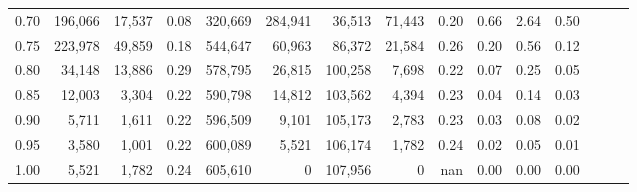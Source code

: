 \begin{tabular}{rrrrrrrrrrrrrrr}
0.70 &  196,066 &  17,537 &  0.08 &  320,669 &  284,941 &   36,513 &   71,443 &  0.20 &  0.66 &  2.64 &      0.50 \\
0.75 &  223,978 &  49,859 &  0.18 &  544,647 &   60,963 &   86,372 &   21,584 &  0.26 &  0.20 &  0.56 &      0.12 \\
0.80 &   34,148 &  13,886 &  0.29 &  578,795 &   26,815 &  100,258 &    7,698 &  0.22 &  0.07 &  0.25 &      0.05 \\
0.85 &   12,003 &   3,304 &  0.22 &  590,798 &   14,812 &  103,562 &    4,394 &  0.23 &  0.04 &  0.14 &      0.03 \\
0.90 &    5,711 &   1,611 &  0.22 &  596,509 &    9,101 &  105,173 &    2,783 &  0.23 &  0.03 &  0.08 &      0.02 \\
0.95 &    3,580 &   1,001 &  0.22 &  600,089 &    5,521 &  106,174 &    1,782 &  0.24 &  0.02 &  0.05 &      0.01 \\
1.00 &    5,521 &   1,782 &  0.24 &  605,610 &        0 &  107,956 &        0 &   nan &  0.00 &  0.00 &      0.00 \\
\bottomrule
\end{tabular}
